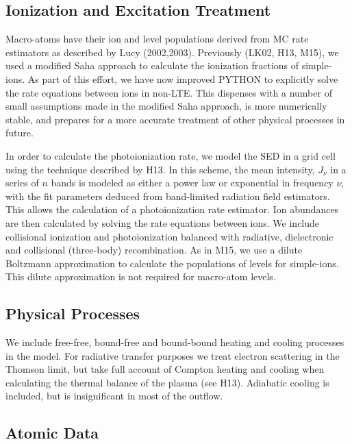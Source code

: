 \documentclass[useAMS,usenatbib]{mn2e_x}
\begin{document}
\subsection{Ionization and Excitation Treatment}

Macro-atoms have their ion and level populations derived from
MC rate estimators as described by Lucy (2002,2003). 
Previously (LK02, H13, M15), we used a modified Saha approach to 
calculate the ionization fractions
of simple-ions. As part of  this effort, we have 
now improved {\sc PYTHON} to explicitly solve the 
rate equations between ions in non-LTE. This dispenses with a number of small assumptions 
made in the modified Saha approach, is more numerically stable, and
prepares for a more accurate treatment of other physical processes in future. 

In order to calculate the photoionization rate, 
we model the SED in a grid cell using the technique described by H13. In this scheme,
the mean intensity, $J_{\nu}$ in a series of $n$ bands is modeled as either a power law or exponential
in frequency $\nu$, with the fit parameters deduced from band-limited radiation field estimators.
This allows the calculation of a photoionization rate estimator. Ion abundances are
then calculated by solving the rate equations between ions. We include collisional ionization and photoionization balanced with radiative, 
dielectronic and collisional (three-body) recombination.
As in M15, we use a dilute Boltzmann approximation to calculate 
the populations of levels for simple-ions. This dilute approximation 
is not required for macro-atom levels. 

\subsection{Physical Processes}

We include  free-free, bound-free and bound-bound heating
and cooling processes in the model. For radiative transfer purposes
we treat electron scattering in the Thomson limit, 
but take full account of Compton heating and cooling when
calculating the thermal balance of the plasma (see H13).
Adiabatic cooling is included, but is insignificant 
in most of the outflow.


\subsection{Atomic Data}
\end{document}
